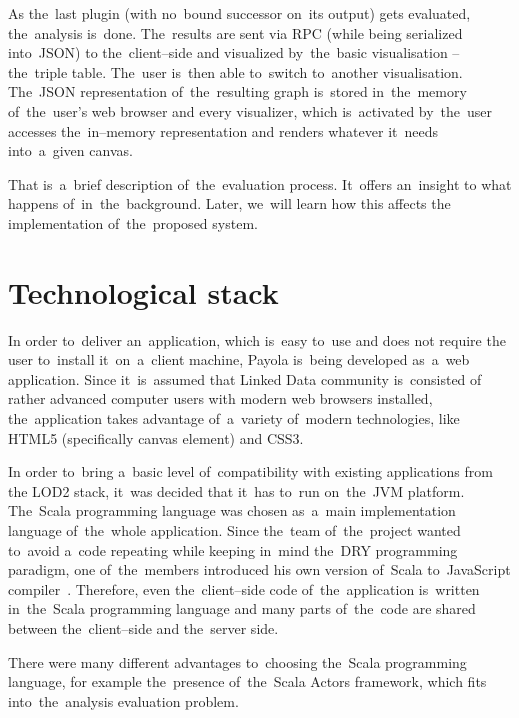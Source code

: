 As the~last plugin (with no~bound successor on~its output) gets evaluated, the~analysis is~done. The~results are sent via RPC (while being serialized into~JSON) 
to the~client--side and visualized by~the~basic visualisation -- the~triple 
table. The~user is~then able to~switch to~another visualisation. The~JSON 
representation of~the~resulting graph is~stored in~the~memory of~the~user's web 
browser and every visualizer, which is~activated by~the~user accesses the~in--memory representation and renders whatever it~needs into~a~given canvas.

That is~a~brief description of~the~evaluation process. It~offers an~insight
to what happens of~in~the~background. Later, we~will learn how this affects 
the implementation of~the~proposed system.

\section{Technological stack}
In order to~deliver an~application, which is~easy to~use and does not require 
the user to~install it~on~a~client machine, Payola is~being developed as~a~web
application. Since it~is~assumed that Linked Data community is~consisted of
rather advanced computer users with modern web browsers installed, the~application 
takes advantage of~a~variety of~modern technologies, like HTML5 (specifically
canvas element) and CSS3.

In order to~bring a~basic level of~compatibility with existing applications from 
the LOD2 stack, it~was decided that it~has to~run on~the~JVM platform. The~Scala programming language was chosen as~a~main implementation language of~the~whole application. Since the~team of~the~project wanted to~avoid a~code repeating 
while keeping in~mind the~DRY programming paradigm, one of~the~members 
introduced his own version of~Scala to~JavaScript compiler~\cite{s2js}. Therefore, even the~client--side code of~the~application is~written in~the~Scala programming language 
and many parts of~the~code are shared between the~client--side and the~server 
side.

There were many different advantages to~choosing the~Scala programming language, 
for example the~presence of~the~Scala Actors framework, which fits into~the~analysis evaluation problem.


